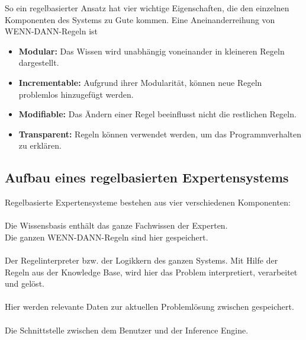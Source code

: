 \noindent So ein regelbasierter Ansatz hat vier wichtige Eigenschaften, die den einzelnen Komponenten des Systems zu Gute kommen. Eine Aneinanderreihung von WENN-DANN-Regeln ist\\

\begin{itemize}
    \item \textbf{Modular:} Das Wissen wird unabhängig voneinander in kleineren Regeln dargestellt.
    \item \textbf{Incrementable:} Aufgrund ihrer Modularität, können neue Regeln problemlos hinzugefügt werden.
    \item \textbf{Modifiable:} Das Ändern einer Regel beeinflusst nicht die restlichen Regeln.
    \item \textbf{Transparent:} Regeln können verwendet werden, um das Programmverhalten zu erklären.
\end{itemize}

\subsection{Aufbau eines regelbasierten Expertensystems}
\noindent Regelbasierte Expertensysteme bestehen aus vier verschiedenen Komponenten:\\

\\
Die Wissensbasis enthält das ganze Fachwissen der Experten.\\
Die ganzen WENN-DANN-Regeln sind hier gespeichert.\\

\\
Der Regelinterpreter bzw. der Logikkern des ganzen Systems. Mit Hilfe der Regeln aus der Knowledge Base, wird hier das Problem interpretiert, verarbeitet und gelöst.\\

\\
Hier werden relevante Daten zur aktuellen Problemlösung zwischen gespeichert.\\

\\
Die Schnittstelle zwischen dem Benutzer und der Inference Engine.\\

